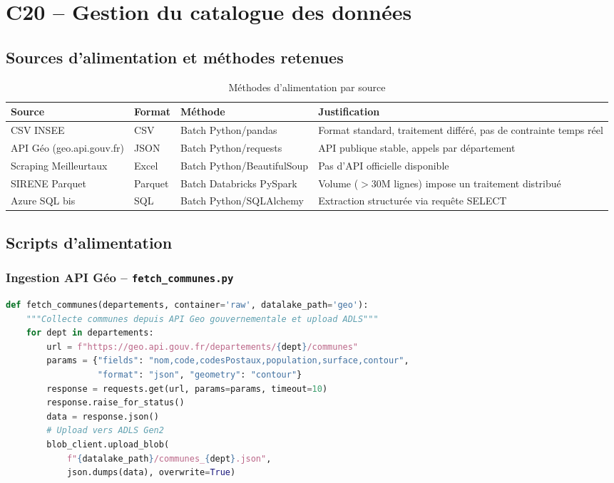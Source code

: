 \documentclass[12pt,a4paper]{article}
\begin{document}
\newpage
\section{C20 -- Gestion du catalogue des données}

\subsection{Sources d'alimentation et méthodes retenues}

\begin{table}[H]
\centering
\small
\begin{tabular}{L{3cm} L{2.5cm} L{2.5cm} L{5.5cm}}
  \toprule
  \textbf{Source} & \textbf{Format} & \textbf{Méthode} & \textbf{Justification} \\
  \midrule
  CSV INSEE & CSV & Batch Python/pandas & Format standard, traitement différé, pas de contrainte temps réel \\
  API Géo (geo.api.gouv.fr) & JSON & Batch Python/requests & API publique stable, appels par département \\
  Scraping Meilleurtaux & Excel & Batch Python/BeautifulSoup & Pas d'API officielle disponible \\
  SIRENE Parquet & Parquet & Batch Databricks PySpark & Volume ($>$30M lignes) impose un traitement distribué \\
  Azure SQL bis & SQL & Batch Python/SQLAlchemy & Extraction structurée via requête SELECT \\
  \bottomrule
\end{tabular}
\caption{Méthodes d'alimentation par source}
\end{table}

\subsection{Scripts d'alimentation}

\subsubsection{Ingestion API Géo -- \texttt{fetch\_communes.py}}

\begin{lstlisting}[language=Python, caption=Extrait -- Ingestion API et upload ADLS (Annexe~\ref{annexe:fetch})]
def fetch_communes(departements, container='raw', datalake_path='geo'):
    """Collecte communes depuis API Geo gouvernementale et upload ADLS"""
    for dept in departements:
        url = f"https://geo.api.gouv.fr/departements/{dept}/communes"
        params = {"fields": "nom,code,codesPostaux,population,surface,contour",
                  "format": "json", "geometry": "contour"}
        response = requests.get(url, params=params, timeout=10)
        response.raise_for_status()
        data = response.json()
        # Upload vers ADLS Gen2
        blob_client.upload_blob(
            f"{datalake_path}/communes_{dept}.json",
            json.dumps(data), overwrite=True)
\end{lstlisting}
\end{document}
